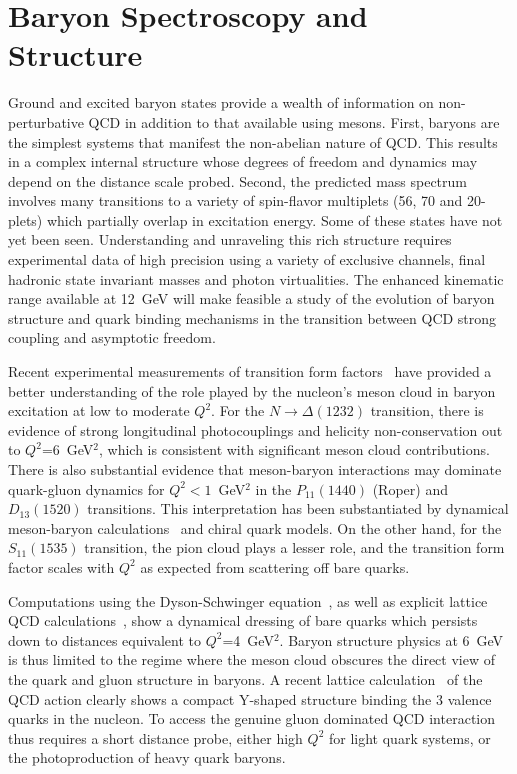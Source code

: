 \section{Baryon Spectroscopy and Structure}

Ground and excited baryon states provide a wealth of information on
non-perturbative QCD in addition to that available using mesons.  First, 
baryons are the simplest systems that manifest the non-abelian nature of 
QCD.  This results in a complex internal structure whose degrees of 
freedom and dynamics may depend on the distance scale probed.  Second, 
the predicted mass spectrum involves many transitions to a variety of 
spin-flavor multiplets (56, 70 and 20-plets) which partially overlap in 
excitation energy.  Some of these states have not yet been seen.  
Understanding and unraveling this rich structure requires experimental 
data of high precision using a variety of exclusive channels, final 
hadronic state invariant masses and photon virtualities.  The enhanced 
kinematic range available at 12~GeV will make feasible a study of the 
evolution of baryon structure and quark binding mechanisms in the 
transition between QCD strong coupling and asymptotic freedom.  

Recent experimental measurements of transition form factors~\cite{Bur1,Joo02} 
have provided a better understanding of the role played by the nucleon's 
meson cloud in baryon excitation at low to moderate $Q^2$.  For the
$N \to \Delta(1232)$ transition, there is evidence of strong longitudinal 
photocouplings and helicity non-conservation out to $Q^2$=6~GeV$^2$, which 
is consistent with significant meson cloud contributions.  There is also 
substantial evidence that meson-baryon interactions may dominate 
quark-gluon dynamics for $Q^2<1$~GeV$^2$ in the $P_{11}(1440)$ (Roper) 
and $D_{13}(1520)$ transitions.  This interpretation has been substantiated
by dynamical meson-baryon calculations~\cite{Lee04} and chiral quark models.
On the other hand, for the $S_{11}(1535)$ transition, the pion cloud plays 
a lesser role, and the transition form factor scales with $Q^2$ as expected 
from scattering off bare quarks.  

Computations using the Dyson-Schwinger equation~\cite{Bha03}, as well as 
explicit lattice QCD calculations~\cite{Bow02}, show a dynamical dressing 
of bare quarks which persists down to distances equivalent to 
$Q^2$=4~GeV$^2$.  Baryon structure physics at 6~GeV is thus limited to 
the regime where the meson cloud obscures the direct view of the quark 
and gluon structure in baryons.  A recent lattice calculation~\cite{Tak04} 
of the QCD action clearly shows a compact Y-shaped structure binding the 3 
valence quarks in the nucleon. To access the genuine gluon dominated QCD 
interaction thus requires a short distance probe, either high $Q^2$ for 
light quark systems, or the photoproduction of heavy quark baryons.

